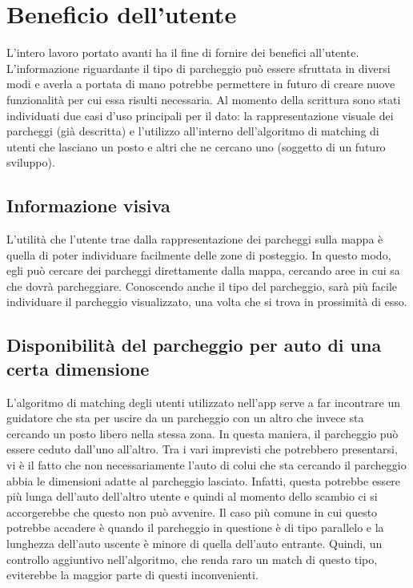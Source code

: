 \section{Beneficio dell'utente} 

L'intero lavoro portato avanti ha il fine di fornire dei benefici all'utente.
L'informazione riguardante il tipo di parcheggio può essere sfruttata in
diversi modi e averla a portata di mano potrebbe permettere in futuro di 
creare nuove funzionalità per cui essa risulti necessaria. Al momento della
scrittura sono stati individuati due casi d'uso principali per il dato: la 
rappresentazione visuale dei parcheggi (già descritta) e l'utilizzo all'interno 
dell'algoritmo di matching di utenti che lasciano un posto e altri che ne
cercano uno (soggetto di un futuro sviluppo).

\subsection{Informazione visiva}

L'utilità che l'utente trae dalla rappresentazione dei parcheggi sulla mappa è 
quella di poter individuare facilmente delle zone di posteggio. In questo modo,
egli può cercare dei parcheggi direttamente dalla mappa, cercando aree in cui
sa che dovrà parcheggiare. Conoscendo anche il tipo del parcheggio, sarà più
facile individuare il parcheggio visualizzato, una volta che si trova in 
prossimità di esso.

\subsection{Disponibilità del parcheggio per auto di una certa dimensione}

L'algoritmo di matching degli utenti utilizzato nell'app serve a far incontrare un
guidatore che sta per uscire da un parcheggio con un altro che invece sta
cercando un posto libero nella stessa zona. In questa maniera, il parcheggio può
essere ceduto dall'uno all'altro. Tra i vari imprevisti che potrebbero presentarsi,
vi è il fatto che non necessariamente l'auto di colui che sta cercando il parcheggio 
abbia le dimensioni adatte al parcheggio lasciato. Infatti, questa potrebbe essere 
più lunga dell'auto dell'altro utente e quindi al momento dello scambio ci si 
accorgerebbe che questo non può avvenire. Il caso più comune in cui questo potrebbe
accadere è quando il parcheggio in questione è di tipo parallelo e la lunghezza
dell'auto uscente è minore di quella dell'auto entrante. Quindi, un controllo 
aggiuntivo nell'algoritmo, che renda raro un match di questo tipo, eviterebbe la
maggior parte di questi inconvenienti.